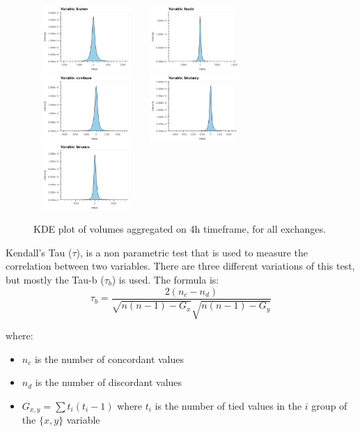 \documentclass[10pt]{asme2ej}
\begin{document}
\begin{figure}[H]
	\centering
	\includegraphics[width=4cm, height = 2.5cm]{kde1.png}
	\includegraphics[width=4cm, height = 2.5cm]{kde2.png}
	\includegraphics[width=4cm, height = 2.5cm]{kde3.png}
	\includegraphics[width=4cm, height = 2.5cm]{kde4.png}
	\includegraphics[width=4cm, height = 2.5cm]{kde5.png}
	\caption{KDE plot of volumes aggregated on 4h timeframe, for all exchanges.}
	\label{fig:kdevol}
\end{figure}


Kendall's Tau (\(\tau\)), is a non parametric test that is used to measure the correlation between two variables. There are three different variations of this test, but mostly the Tau-b (\(\tau_b\)) is used. The formula is:
\[
\tau_b = \frac{2(n_c - n_d)}{\sqrt{n(n-1) - G_x}\sqrt{n(n-1) - G_y}} 
\]

where:
\begin{itemize}
	\item \(n_c\) is the number of concordant values
	\item \(n_d\) is the number of discordant values
	\item \(G_{x,y} = \sum{t_i(t_i-1)}\) where \(t_i\) is the number of tied values in the \(i\) group of the \(\{x,y\}\) variable
\end{itemize}
\end{document}
